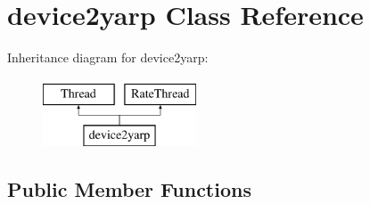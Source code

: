 \hypertarget{classdevice2yarp}{}\section{device2yarp Class Reference}
\label{classdevice2yarp}
Inheritance diagram for device2yarp\+:\begin{figure}[H]
\begin{center}
\leavevmode
\includegraphics[height=2.000000cm]{classdevice2yarp}
\end{center}
\end{figure}
\subsection*{Public Member Functions}
